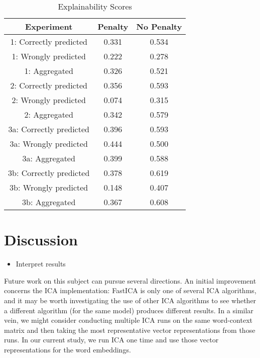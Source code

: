 \documentclass{article}
\begin{document}
\begin{table}
 \caption{Explainability Scores}
  \centering
  \begin{tabular}{|c|c|c|}
    \hline
    \rowcolor{lightgray} \textbf{Experiment} & \textbf{Penalty} & \textbf{No Penalty} \\
    \hline
    1: Correctly predicted & 0.331 & 0.534 \\
    \hline
    1: Wrongly predicted & 0.222 & 0.278 \\
    \hline
    1: Aggregated & 0.326 & 0.521 \\
    \hline
    2: Correctly predicted & 0.356 & 0.593 \\
    \hline
    2: Wrongly predicted & 0.074 & 0.315 \\
    \hline
    2: Aggregated & 0.342 & 0.579 \\
    \hline
    3a: Correctly predicted & \cellcolor{green} 0.396 & 0.593 \\
    \hline
    3a: Wrongly predicted & \cellcolor{green} 0.444 & \cellcolor{green} 0.500 \\
    \hline
    3a: Aggregated & \cellcolor{green} 0.399 & 0.588 \\
    \hline
    3b: Correctly predicted & 0.378 & \cellcolor{green} 0.619 \\
    \hline
    3b: Wrongly predicted & 0.148 & 0.407 \\
    \hline
    3b: Aggregated & 0.367 & \cellcolor{green} 0.608 \\
    \hline
  \end{tabular}
  \label{tab:expl}
\end{table}

\hypertarget{discussion}{%
\section{Discussion}\label{discussion}}

\label{sec:discuss}

\begin{itemize}
\tightlist
\item
  Interpret results
\end{itemize}

Future work on this subject can pursue several directions. An initial
improvement concerns the ICA implementation: FastICA is only one of
several ICA algorithms, and it may be worth investigating the use of
other ICA algorithms to see whether a different algorithm (for the same
model) produces different results. In a similar vein, we might consider
conducting multiple ICA runs on the same word-context matrix and then
taking the most representative vector representations from those runs.
In our current study, we run ICA one time and use those vector
representations for the word embeddings.
\end{document}
